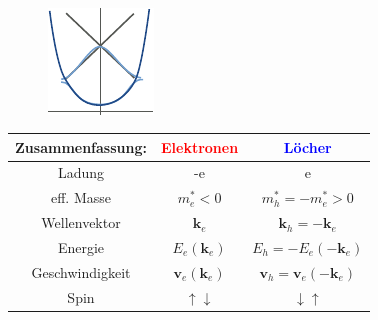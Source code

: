 \begin{itemize}
\begin{align*}
        \end{align*}
        \begin{figure}[H]
            \centering
            \includegraphics{figures/6_4Chaos.pdf}
            \caption{}
            \label{}
        \end{figure}
        \begin{table}[H]
            \centering
            \begin{tabular}{c|c|c}
                \textbf{Zusammenfassung:} & \textcolor{red}{Elektronen} & \textcolor{blue}{Löcher} \\ \hline \hline
                Ladung & -e & e \\
                eff. Masse & $m_e^* < 0$ & $m_h^* = - m_e^* > 0$ \\
                Wellenvektor & $\textbf{k}_e$ & $\textbf{k}_h = - \textbf{k}_e$ \\
                Energie & $E_e(\textbf{k}_e)$ & $E_h = - E_e(-\textbf{k}_e)$ \\
                Geschwindigkeit & $\textbf{v}_e(\textbf{k}_e)$ & $ \textbf{v}_h = \textbf{v}_e (- \textbf{k}_e)$ \\
                Spin & $\uparrow \downarrow$ & $ \downarrow \uparrow $
            \end{tabular}
        \end{table}
\end{itemize}



